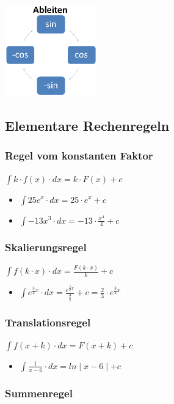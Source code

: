 \includegraphics[width=4cm]{Integral/sin}


\subsection*{Elementare Rechenregeln}


\subsubsection*{Regel vom konstanten Faktor}

$\int k\cdot f(x)\cdot dx=k\cdot F(x)+c$
\begin{itemize}
\item $\int25e^{x}\cdot dx=25\cdot e^{x}+c$
\item $\int-13x^{3}\cdot dx=-13\cdot\frac{x^{4}}{4}+c$
\end{itemize}

\subsubsection*{Skalierungsregel}

$\int f(k\cdot x)\cdot dx=\frac{F(k\cdot x)}{k}+c$
\begin{itemize}
\item $\int e^{\frac{3}{2}x}\cdot dx=\frac{e^{\frac{3}{2}x}}{\frac{3}{2}}+c=\frac{2}{3}\cdot e^{\frac{3}{2}x}$
\end{itemize}

\subsubsection*{Translationsregel}

$\int f(x+k)\cdot dx=F(x+k)+c$
\begin{itemize}
\item $\int\frac{1}{x-6}\cdot dx=ln\mid x-6\mid+c$
\end{itemize}

\subsubsection*{Summenregel}

